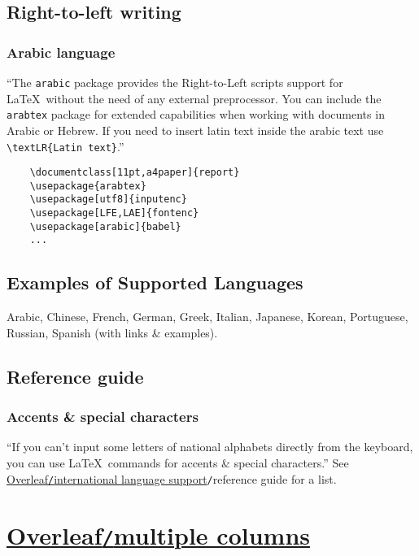 \documentclass{article}
\numberwithin{equation}{section}
\begin{document}
\subsection{Right-to-left writing}

\subsubsection{Arabic language}
``The \texttt{arabic} package provides the Right-to-Left scripts support for \LaTeX\ without the need of any external preprocessor. You can include the \texttt{arabtex} package for extended capabilities when working with documents in Arabic or Hebrew. If you need to insert latin text inside the arabic text use \verb|\textLR{Latin text}|.''
\begin{verbatim}
	\documentclass[11pt,a4paper]{report}
	\usepackage{arabtex}
	\usepackage[utf8]{inputenc}
	\usepackage[LFE,LAE]{fontenc}
	\usepackage[arabic]{babel}
	...
\end{verbatim}

\subsection{Examples of Supported Languages}
Arabic, Chinese, French, German, Greek, Italian, Japanese, Korean, Portuguese, Russian, Spanish (with links \& examples).

\subsection{Reference guide}

\subsubsection{Accents \& special characters}
``If you can't input some letters of national alphabets directly from the keyboard, you can use \LaTeX\ commands for accents \& special characters.'' See \href{https://www.overleaf.com/learn/latex/International_language_support}{Overleaf\texttt{/}international language support}\texttt{/}reference guide for a list.

\section{\href{https://www.overleaf.com/learn/latex/Multiple_columns}{Overleaf\texttt{/}multiple columns}}
\end{document}
